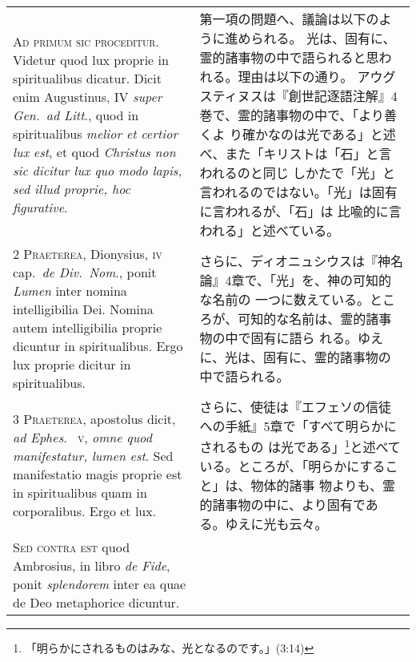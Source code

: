 \documentclass[10pt]{jsarticle} %
\begin{document}
\begin{longtable}{p{21em}p{21em}}




{\huge A}{\scshape d primum sic proceditur}. Videtur quod lux proprie in
spiritualibus dicatur. Dicit enim Augustinus, IV {\itshape super Gen.~ad
Litt}., quod in spiritualibus {\itshape melior et certior lux est}, et
quod {\itshape Christus non sic dicitur lux quo modo lapis, sed illud
proprie, hoc figurative}.

&


第一項の問題へ、議論は以下のように進められる。
光は、固有に、霊的諸事物の中で語られると思われる。理由は以下の通り。
アウグスティヌスは『創世記逐語注解』4巻で、霊的諸事物の中で、「より善くよ
 り確かなのは光である」と述べ、また「キリストは「石」と言われるのと同じ
 しかたで「光」と言われるのではない。「光」は固有に言われるが、「石」は
 比喩的に言われる」と述べている。

\\


{\scshape 2 Praeterea}, Dionysius, {\scshape iv} cap.~{\itshape de
Div.~Nom}., ponit {\itshape Lumen} inter nomina intelligibilia
Dei. Nomina autem intelligibilia proprie dicuntur in spiritualibus. Ergo
lux proprie dicitur in spiritualibus.

&

さらに、ディオニュシウスは『神名論』4章で、「光」を、神の可知的な名前の
 一つに数えている。ところが、可知的な名前は、霊的諸事物の中で固有に語ら
 れる。ゆえに、光は、固有に、霊的諸事物の中で語られる。

\\


{\scshape 3 Praeterea}, apostolus dicit, {\itshape ad Ephes}.~{\scshape
v}, {\itshape omne quod manifestatur, lumen est}. Sed manifestatio magis
proprie est in spiritualibus quam in corporalibus. Ergo et lux.

&

さらに、使徒は『エフェソの信徒への手紙』5章で「すべて明らかにされるもの
 は光である」\footnote{「明らかにされるものはみな、光となるのです。」(3:14)}と述べている。ところが、「明らかにすること」は、物体的諸事
 物よりも、霊的諸事物の中に、より固有である。ゆえに光も云々。


\\


{\scshape Sed contra est} quod Ambrosius, in libro {\itshape de Fide},
ponit {\itshape splendorem} inter ea quae de Deo metaphorice dicuntur.

&


\end{longtable}
\end{document}
